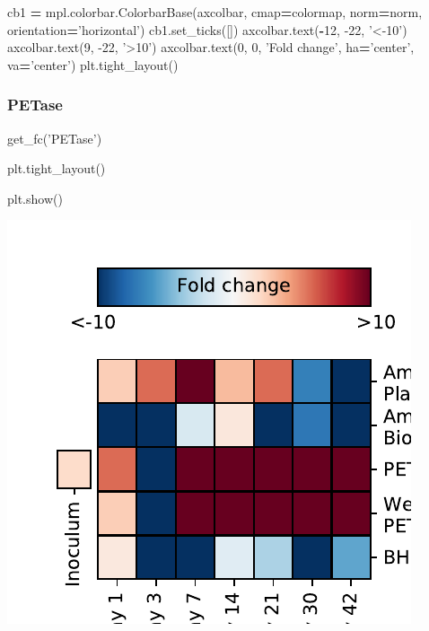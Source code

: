 \documentclass[
]{article}
\newenvironment{Shaded}{\begin{snugshade}}{\end{snugshade}}
\newcommand{\DecValTok}[1]{\textcolor[rgb]{0.00,0.00,0.81}{#1}}
\newcommand{\NormalTok}[1]{#1}
\newcommand{\OperatorTok}[1]{\textcolor[rgb]{0.81,0.36,0.00}{\textbf{#1}}}
\newcommand{\StringTok}[1]{\textcolor[rgb]{0.31,0.60,0.02}{#1}}
\begin{document}
\begin{Shaded}
\begin{Highlighting}[]
\NormalTok{  cb1 }\OperatorTok{=}\NormalTok{ mpl.colorbar.ColorbarBase(axcolbar, cmap}\OperatorTok{=}\NormalTok{colormap, norm}\OperatorTok{=}\NormalTok{norm, orientation}\OperatorTok{=}\StringTok{'horizontal'}\NormalTok{)}
\NormalTok{  cb1.set_ticks([])}
\NormalTok{  axcolbar.text(}\OperatorTok{-}\DecValTok{12}\NormalTok{, }\DecValTok{-22}\NormalTok{, }\StringTok{'<-10'}\NormalTok{)}
\NormalTok{  axcolbar.text(}\DecValTok{9}\NormalTok{, }\DecValTok{-22}\NormalTok{, }\StringTok{'>10'}\NormalTok{)}
\NormalTok{  axcolbar.text(}\DecValTok{0}\NormalTok{, }\DecValTok{0}\NormalTok{, }\StringTok{'Fold change'}\NormalTok{, ha}\OperatorTok{=}\StringTok{'center'}\NormalTok{, va}\OperatorTok{=}\StringTok{'center'}\NormalTok{)}
\NormalTok{  plt.tight_layout()}
\end{Highlighting}
\end{Shaded}

\hypertarget{petase-1}{%
\subsubsection{PETase}\label{petase-1}}

\begin{Shaded}
\begin{Highlighting}[]
\NormalTok{get_fc(}\StringTok{'PETase'}\NormalTok{)}
\end{Highlighting}
\end{Shaded}

\begin{Shaded}
\begin{Highlighting}[]
\NormalTok{plt.tight_layout()}
\end{Highlighting}
\end{Shaded}

\begin{Shaded}
\begin{Highlighting}[]
\NormalTok{plt.show()}
\end{Highlighting}
\end{Shaded}

\includegraphics{20-6-15-PET-plastisphere-PICRUSt2_files/figure-latex/plot_fc_petase-1.pdf}
\end{document}

